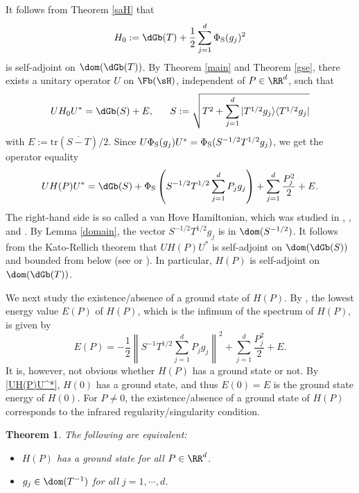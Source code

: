 \documentclass[12pt,draft]{article}
\theoremstyle{plain}
\newtheorem{thm}[theorem]{\bf Theorem}
\numberwithin{equation}{section}
\theoremstyle{remark}
\begin{document}
It follows from Theorem \ref{saH} that 
\[
  H_0 := \dGb(T) + \frac{1}{2}\sum_{j=1}^{d}\Phi_{\rm S}(g_j)^2
\]
is self-adjoint on $\dom(\dGb(T))$.
By Theorem \ref{main} and Theorem \ref{gse}, there exists a unitary operator $U$ on $\Fb(\sH)$,
independent of $P\in\RR^d$, such that
\[
  UH_0U^* = \dGb(S) + E, \ \ \ \ \ S:=\sqrt{T^2+\sum_{j=1}^d|T^{1/2}g_j\rangle\langle T^{1/2}g_j|}
\]
with $E:=\mathrm{tr}(\overline{S-T})/2$.
Since $U\Phi_{\rm S}(g_j)U^*=\Phi_{\rm S}(S^{-1/2}T^{1/2}g_j)$, we get the operator equality
\begin{equation}\label{UH(P)U^*}
UH(P)U^{*} = \dGb(S) +\Phi_{\rm S}\left(S^{-1/2}T^{1/2}\sum_{j=1}^{d} P_jg_j\right)+\sum_{j=1}^{d}\frac{P_j^2}{2} +E.
\end{equation}
The right-hand side is so called a van Hove Hamiltonian, which was studied in 
\cite[Chapter 12]{A00}, \cite[Chapter 13]{A18}, \cite{De03} and \cite[Section 11.6]{DG13}.
By Lemma \ref{domain}, the vector $S^{-1/2}T^{1/2}g_j$ is in $\dom(S^{-1/2})$.
It follows from the Kato-Rellich theorem that $UH(P)U^{*}$ is self-adjoint on $\dom(\dGb(S))$ 
and bounded from below (see \cite[Theorem 13.1]{A18} or \cite[Proposition 3.13]{De03}). %
In particular, $H(P)$ is self-adjoint on $\dom(\dGb(T))$.

We next study the existence/absence of a ground state of $H(P)$.
By \cite[Theorem 13.5]{A18}, the lowest energy value $E(P)$ of $H(P)$, which is the infimum of the spectrum of $H(P)$, is given by
\[
E(P) = -\frac{1}{2} \left\|S^{-1}T^{1/2}\sum_{j=1}^dP_jg_j\right\|^2 + \sum_{j=1}^d\frac{P_j^2}{2} + E.
\]
It is, however, not obvious whether $H(P)$ has a ground state or not.
By \eqref{UH(P)U^*}, $H(0)$ has a ground state, and thus $E(0)=E$ is the ground state energy of $H(0)$.
For $P\not=0$, the existence/absence of a ground state of $H(P)$ corresponds to the infrared regularity/singularity condition.

\begin{thm}\label{e/a gs}
The following are equivalent:
\begin{itemize}{}{}
\item[(1)] $H(P)$ has a ground state for all $P\in\RR^d$.
\item[(2)] $g_j\in\dom(T^{-1})$ for all $j=1,\cdots,d$.
\end{itemize}
\end{thm}
\end{document}
